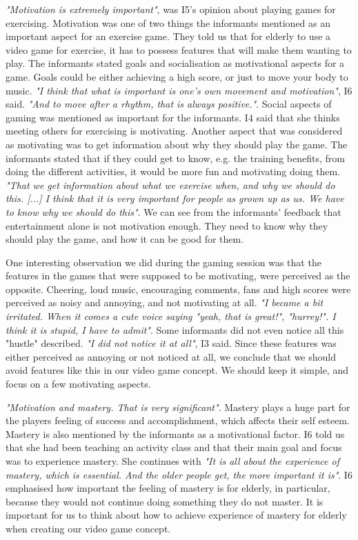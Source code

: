 \emph{"Motivation is extremely important"}, was I5's opinion about playing games for exercising. Motivation was one of two things the informants mentioned as an important aspect for an exercise game. They told us that for elderly to use a video game for exercise, it has to possess features that will make them wanting to play. The informants stated goals and socialisation as motivational aspects for a game. Goals could be either achieving a high score, or just to move your body to music. \emph{"I think that what is important is one's own movement and motivation"}, I6 said. \emph{"And to move after a rhythm, that is always positive."}. Social aspects of gaming was mentioned as important for the informants. I4 said that she thinks meeting others for exercising is motivating.   Another aspect that was considered as motivating was to get information about why they should play the game. The informants stated that if they could get to know, e.g. the training benefits, from doing the different activities, it would be more fun and motivating doing them. \emph{"That we get information about what we exercise when, and why we should do this. [...] I think that it is very important for people as grown up as us. We have to know why we should do this"}. We can see from the informants' feedback that entertainment alone is not motivation enough. They need to know why they should play the game, and how it can be good for them. 

One interesting observation we did during the gaming session was that the features in the games that were supposed to be motivating, were perceived as the opposite. Cheering, loud music, encouraging comments, fans and high scores were perceived as noisy and annoying, and not motivating at all. \emph{"I became a bit irritated. When it comes a cute voice saying "yeah, that is great!", "hurrey!". I think it is stupid, I have to admit"}. Some informants did not even notice all this "hustle" described. \emph{"I did not notice it at all"}, I3 said. Since these features was either perceived as annoying or not noticed at all, we conclude that we should avoid features like this in our video game concept. We should keep it simple, and focus on a few motivating aspects. 

\emph{"Motivation and mastery. That is very significant"}. Mastery plays a huge part for the players feeling of success and accomplishment, which affects their self esteem. Mastery is also mentioned by the informants as a motivational factor. I6 told us that she had been teaching an activity class and that their main goal and focus was to experience mastery. She continues with \emph{"It is all about the experience of mastery, which is essential. And the older people get, the more important it is"}. I6 emphasised how important the feeling of mastery is for elderly, in particular, because they would not continue doing something they do not master. It is important for us to think about how to achieve experience of mastery for elderly when creating our video game concept. 
  
